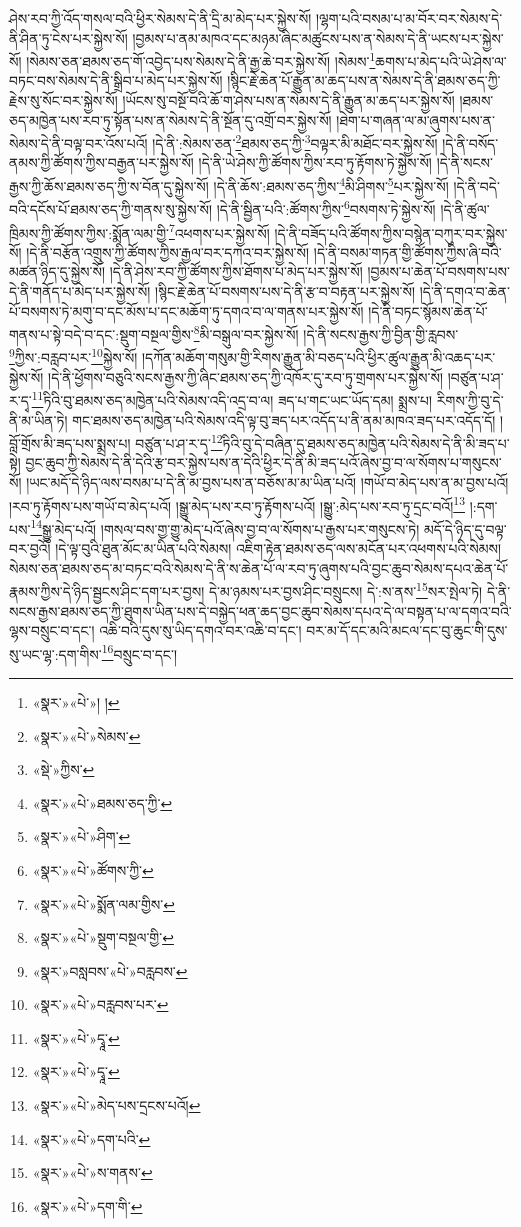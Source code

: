 ཤེས་རབ་ཀྱི་འོད་གསལ་བའི་ཕྱིར་སེམས་དེ་ནི་དྲི་མ་མེད་པར་སྐྱེས་སོ། །ལྷག་པའི་བསམ་པ་མ་བོར་བར་སེམས་དེ་ནི་ཤིན་ཏུ་ངེས་པར་སྐྱེས་སོ། །བྱམས་པ་ནམ་མཁའ་དང་མཉམ་ཞིང་མཚུངས་པས་ན་སེམས་དེ་ནི་ཡངས་པར་སྐྱེས་སོ། །སེམས་ཅན་ཐམས་ཅད་གོ་འབྱེད་པས་སེམས་དེ་ནི་རྒྱ་ཆེ་བར་སྐྱེས་སོ། །སེམས་\footnote{«སྣར་»«པེ་»། །}ཆགས་པ་མེད་པའི་ཡེ་ཤེས་ལ་བཏང་བས་སེམས་དེ་ནི་སྒྲིབ་པ་མེད་པར་སྐྱེས་སོ། །སྙིང་རྗེ་ཆེན་པོ་རྒྱུན་མ་ཆད་པས་ན་སེམས་དེ་ནི་ཐམས་ཅད་ཀྱི་རྗེས་སུ་སོང་བར་སྐྱེས་སོ། །ཡོངས་སུ་བསྔོ་བའི་ཆོ་ག་ཤེས་པས་ན་སེམས་དེ་ནི་རྒྱུན་མ་ཆད་པར་སྐྱེས་སོ། །ཐམས་ཅད་མཁྱེན་པས་རབ་ཏུ་སྟོན་པས་ན་སེམས་དེ་ནི་སྔོན་དུ་འགྲོ་བར་སྐྱེས་སོ། །ཐེག་པ་གཞན་ལ་མ་ཞུགས་པས་ན་སེམས་དེ་ནི་བལྟ་བར་འོས་པའོ། །དེ་ནི་:སེམས་ཅན་\footnote{«སྣར་»«པེ་»སེམས་}ཐམས་ཅད་ཀྱི་\footnote{«སྡེ་»ཀྱིས་}བལྟར་མི་མཐོང་བར་སྐྱེས་སོ། །དེ་ནི་བསོད་ནམས་ཀྱི་ཚོགས་ཀྱིས་བརྒྱན་པར་སྐྱེས་སོ། །དེ་ནི་ཡེ་ཤེས་ཀྱི་ཚོགས་ཀྱིས་རབ་ཏུ་རྟོགས་ཏེ་སྐྱེས་སོ། །དེ་ནི་སངས་རྒྱས་ཀྱི་ཆོས་ཐམས་ཅད་ཀྱི་ས་བོན་དུ་སྐྱེས་སོ། །དེ་ནི་ཆོས་:ཐམས་ཅད་ཀྱིས་\footnote{«སྣར་»«པེ་»ཐམས་ཅད་ཀྱི་}མི་ཤིགས་\footnote{«སྣར་»«པེ་»ཤིག་}པར་སྐྱེས་སོ། །དེ་ནི་བདེ་བའི་དངོས་པོ་ཐམས་ཅད་ཀྱི་གནས་སུ་སྐྱེས་སོ། །དེ་ནི་སྦྱིན་པའི་:ཚོགས་ཀྱིས་\footnote{«སྣར་»«པེ་»ཚོགས་ཀྱི་}བསགས་ཏེ་སྐྱེས་སོ། །དེ་ནི་ཚུལ་ཁྲིམས་ཀྱི་ཚོགས་ཀྱིས་:སྨོན་ལམ་གྱི་\footnote{«སྣར་»«པེ་»སྨོན་ལམ་གྱིས་}འཕགས་པར་སྐྱེས་སོ། །དེ་ནི་བཟོད་པའི་ཚོགས་ཀྱིས་བསྙེན་བཀུར་བར་སྐྱེས་སོ། །དེ་ནི་བརྩོན་འགྲུས་ཀྱི་ཚོགས་ཀྱིས་རྒྱལ་བར་དཀའ་བར་སྐྱེས་སོ། །དེ་ནི་བསམ་གཏན་གྱི་ཚོགས་ཀྱིས་ཞི་བའི་མཚན་ཉིད་དུ་སྐྱེས་སོ། །དེ་ནི་ཤེས་རབ་ཀྱི་ཚོགས་ཀྱིས་ཐོགས་པ་མེད་པར་སྐྱེས་སོ། །བྱམས་པ་ཆེན་པོ་བསགས་པས་དེ་ནི་གནོད་པ་མེད་པར་སྐྱེས་སོ། །སྙིང་རྗེ་ཆེན་པོ་བསགས་པས་དེ་ནི་རྩ་བ་བརྟན་པར་སྐྱེས་སོ། །དེ་ནི་དགའ་བ་ཆེན་པོ་བསགས་ཏེ་མགུ་བ་དང་མོས་པ་དང་མཆོག་ཏུ་དགའ་བ་ལ་གནས་པར་སྐྱེས་སོ། །དེ་ནི་བཏང་སྙོམས་ཆེན་པོ་གནས་པ་སྟེ་བདེ་བ་དང་:སྡུག་བསྔལ་གྱིས་\footnote{«སྣར་»«པེ་»སྡུག་བསྔལ་གྱི་}མི་བསྒུལ་བར་སྐྱེས་སོ། །དེ་ནི་སངས་རྒྱས་ཀྱི་བྱིན་གྱི་རླབས་\footnote{«སྣར་»བསླབས་«པེ་»བརླབས་}ཀྱིས་:བརླབ་པར་\footnote{«སྣར་»«པེ་»བརླབས་པར་}སྐྱེས་སོ། །དཀོན་མཆོག་གསུམ་གྱི་རིགས་རྒྱུན་མི་བཅད་པའི་ཕྱིར་ཚུལ་རྒྱུན་མི་འཆད་པར་སྐྱེས་སོ། །དེ་ནི་ཕྱོགས་བཅུའི་སངས་རྒྱས་ཀྱི་ཞིང་ཐམས་ཅད་ཀྱི་འཁོར་དུ་རབ་ཏུ་གྲགས་པར་སྐྱེས་སོ། །བཙུན་པ་ཤ་ར་དྭ་\footnote{«སྣར་»«པེ་»དྭཱ་}ཏིའི་བུ་ཐམས་ཅད་མཁྱེན་པའི་སེམས་འདི་འདྲ་བ་ལ། ཟད་པ་གང་ཡང་ཡོད་དམ། སྨྲས་པ། རིགས་ཀྱི་བུ་དེ་ནི་མ་ཡིན་ཏེ། གང་ཐམས་ཅད་མཁྱེན་པའི་སེམས་འདི་ལྟ་བུ་ཟད་པར་འདོད་པ་ནི་ནམ་མཁའ་ཟད་པར་འདོད་དོ། །བློ་གྲོས་མི་ཟད་པས་སྨྲས་པ། བཙུན་པ་ཤ་ར་དྭ་\footnote{«སྣར་»«པེ་»དྭཱ་}ཏིའི་བུ་དེ་བཞིན་དུ་ཐམས་ཅད་མཁྱེན་པའི་སེམས་དེ་ནི་མི་ཟད་པ་སྟེ། བྱང་ཆུབ་ཀྱི་སེམས་དེ་ནི་དེའི་རྩ་བར་སྐྱེས་པས་ན་དེའི་ཕྱིར་དེ་ནི་མི་ཟད་པའོ་ཞེས་བྱ་བ་ལ་སོགས་པ་གསུངས་སོ། །ཡང་མདོ་དེ་ཉིད་ལས་བསམ་པ་དེ་ནི་མ་བྱས་པས་ན་བཅོས་མ་མ་ཡིན་པའོ། །གཡོ་བ་མེད་པས་ན་མ་བྱས་པའོ། །རབ་ཏུ་རྟོགས་པས་གཡོ་བ་མེད་པའོ། །སྒྱུ་མེད་པས་རབ་ཏུ་རྟོགས་པའོ། །སྒྱུ་:མེད་པས་རབ་ཏུ་དྲང་བའོ།\footnote{«སྣར་»«པེ་»མེད་པས་དྲངས་པའོ།} །:དག་པས་\footnote{«སྣར་»«པེ་»དག་པའི་}སྒྱུ་མེད་པའོ། །གསལ་བས་གྱ་གྱུ་མེད་པའོ་ཞེས་བྱ་བ་ལ་སོགས་པ་རྒྱས་པར་གསུངས་ཏེ། མདོ་དེ་ཉིད་དུ་བལྟ་བར་བྱའོ། །དེ་ལྟ་བུའི་ཐུན་མོང་མ་ཡིན་པའི་སེམས། འཇིག་རྟེན་ཐམས་ཅད་ལས་མངོན་པར་འཕགས་པའི་སེམས། སེམས་ཅན་ཐམས་ཅད་མ་བཏང་བའི་སེམས་དེ་ནི་ས་ཆེན་པོ་ལ་རབ་ཏུ་ཞུགས་པའི་བྱང་ཆུབ་སེམས་དཔའ་ཆེན་པོ་རྣམས་ཀྱིས་དེ་ཉིད་སྦྱངས་ཤིང་དག་པར་བྱས། དེ་མ་ཉམས་པར་བྱས་ཤིང་བསྲུངས། དེ་:ས་ནས་\footnote{«སྣར་»«པེ་»ས་གནས་}སར་སྤེལ་ཏེ། དེ་ནི་སངས་རྒྱས་ཐམས་ཅད་ཀྱི་ཐུགས་ཡིན་པས་དེ་བསྐྱེད་ཕན་ཆད་བྱང་ཆུབ་སེམས་དཔའ་དེ་ལ་བསྟན་པ་ལ་དགའ་བའི་ལྷས་བསྲུང་བ་དང་། འཆི་བའི་དུས་སུ་ཡིད་དགའ་བར་འཆི་བ་དང་། བར་མ་དོ་དང་མའི་མངལ་དང་བུ་ཆུང་གི་དུས་སུ་ཡང་ལྷ་:དག་གིས་\footnote{«སྣར་»«པེ་»དག་གི་}བསྲུང་བ་དང་། 
